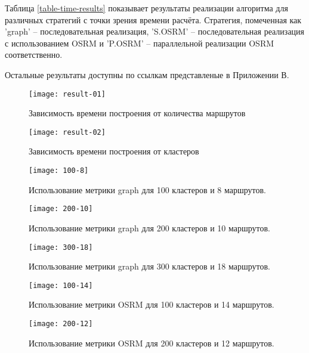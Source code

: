 Таблица \ref{table-time-results} показывает результаты реализации алгоритма для различных стратегий с точки 
зрения времени расчёта. Стратегия, помеченная как 'graph' -- последовательная реализация, 'S.OSRM' -- 
последовательная реализация с использованием OSRM и 'P.OSRM' -- параллельной реализации OSRM соответственно.

Остальные результаты доступны по ссылкам представленые в Приложении В.

\begin{figure}[ht!]
    \centering
    \texttt{[image: result-01]}
    \caption{Зависимость времени построения от количества маршрутов}
    \label{fig:result-01}
\end{figure}

\begin{figure}[ht!]
    \centering
    \texttt{[image: result-02]}
    \caption{Зависимость времени построения от кластеров}
    \label{fig:result-02}
\end{figure}

\begin{figure}[ht!]
    \centering
    \texttt{[image: 100-8]}
    \caption{Использование метрики graph для 100 кластеров и 8 маршрутов.}
    \label{fig:network-01a}
\end{figure}

\begin{figure}[ht!]
    \centering
    \texttt{[image: 200-10]}
    \caption{Использование метрики graph для 200 кластеров и 10 маршрутов.}
    \label{fig:network-01b}
\end{figure}

\begin{figure}[ht!]
    \centering
    \texttt{[image: 300-18]}
    \caption{Использование метрики graph для 300 кластеров и 18 маршрутов.}
    \label{fig:network-01c}
\end{figure}

\begin{figure}[ht!]
    \centering
    \texttt{[image: 100-14]}
    \caption{Использование метрики OSRM для 100 кластеров и 14 маршрутов.}
    \label{fig:network-02a}
\end{figure}

\begin{figure}[ht!]
    \centering
    \texttt{[image: 200-12]}
    \caption{Использование метрики OSRM для 200 кластеров и 12 маршрутов.}
    \label{fig:network-02b}
\end{figure}

